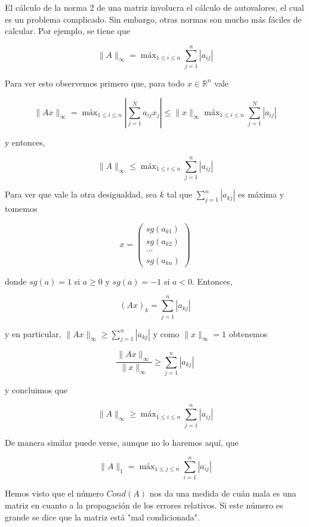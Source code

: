 \documentclass[10pt]{article}
\begin{document}
El cálculo de la norma 2 de una matriz involucra el cálculo de autovalores, el cual es un problema complicado. Sin embargo, otras normas son mucho más fáciles de calcular. Por ejemplo, se tiene que

$$
\|A\|_{\infty}=\operatorname{máx}_{1 \leq i \leq n} \sum_{j=1}^{n}\left|a_{i j}\right|
$$

Para ver esto observemos primero que, para todo $x \in \mathbb{R}^{n}$ vale

$$
\|A x\|_{\infty}=\operatorname{máx}_{1 \leq i \leq n}\left|\sum_{j=1}^{N} a_{i j} x_{j}\right| \leq\|x\|_{\infty} \operatorname{máx}_{1 \leq i \leq n} \sum_{j=1}^{N}\left|a_{i j}\right|
$$

y entonces,

$$
\|A\|_{\infty} \leq \operatorname{máx}_{1 \leq i \leq n} \sum_{j=1}^{n}\left|a_{i j}\right|
$$

Para ver que vale la otra desigualdad, sea $k$ tal que $\sum_{j=1}^{n}\left|a_{k j}\right|$ es máxima y tomemos

$$
x=\left(\begin{array}{c}
s g\left(a_{k 1}\right) \\
s g\left(a_{k 2}\right) \\
\cdots \\
s g\left(a_{k n}\right)
\end{array}\right)
$$

donde $s g(a)=1$ si $a \geq 0$ y $s g(a)=-1$ si $a<0$. Entonces,

$$
(A x)_{k}=\sum_{j=1}^{n}\left|a_{k j}\right|
$$

y en particular, $\|A x\|_{\infty} \geq \sum_{j=1}^{n}\left|a_{k j}\right|$ y como $\|x\|_{\infty}=1$ obtenemos

$$
\frac{\|A x\|_{\infty}}{\|x\|_{\infty}} \geq \sum_{j=1}^{n}\left|a_{k j}\right|
$$

y concluimos que

$$
\|A\|_{\infty} \geq \operatorname{máx}_{1 \leq i \leq n} \sum_{j=1}^{n}\left|a_{i j}\right|
$$

De manera similar puede verse, aunque no lo haremos aquí, que

$$
\|A\|_{1}=\operatorname{máx}_{1 \leq j \leq n} \sum_{i=1}^{n}\left|a_{i j}\right|
$$

Hemos visto que el número $C o n d(A)$ nos da una medida de cuán mala es una matriz en cuanto a la propagación de los errores relativos. Si este número es grande se dice que la matriz está "mal condicionada".
\end{document}
